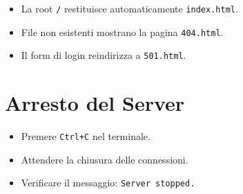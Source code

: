\documentclass[a4paper,12pt]{report}
\begin{document}
\begin{itemize}
    \item La root \texttt{/} restituisce automaticamente \texttt{index.html}.
    \item File non esistenti mostrano la pagina \texttt{404.html}.
    \item Il form di login reindirizza a \texttt{501.html}.
\end{itemize}

\section{Arresto del Server}

\begin{itemize}
    \item Premere \texttt{Ctrl+C} nel terminale.
    \item Attendere la chiusura delle connessioni.
    \item Verificare il messaggio: \texttt{Server stopped.}
\end{itemize}
\end{document}
